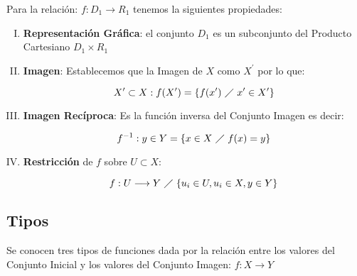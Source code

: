 Para la relación: $f:D_1 \longrightarrow R_1$ tenemos la siguientes propiedades:
\begin{enumerate}[I.]
\item \textbf{Representación Gráfica}: el conjunto $D_1$ es un subconjunto del 
Producto Cartesiano $D_1 \times R_1$

\item \textbf{Imagen}: Establecemos que la Imagen de $X$ como $X^\prime$ por lo 
que:

\begin{equation}
X^\prime \subset X: f(X^\prime) = \{f(x^\prime)\ \diagup\ x^\prime \in X^\prime\}
\end{equation}

\item \textbf{Imagen Recíproca}: Es la función inversa del Conjunto Imagen es 
decir:

\begin{equation}
f^{-1}:y \in Y = \{x \in X\ \diagup\ f(x) = y\}
\end{equation}

% 

\item \textbf{Restricción} de $f$ sobre $U \subset X$:

\begin{equation}
f: U \longrightarrow Y\ \diagup\ \{u_i \in U, u_i \in X, y \in Y\}
\end{equation}

\end{enumerate}

\subsection{Tipos}

Se conocen tres tipos de funciones dada por la relación entre los valores del 
Conjunto Inicial y los valores del Conjunto Imagen: $f:X\longrightarrow Y$

